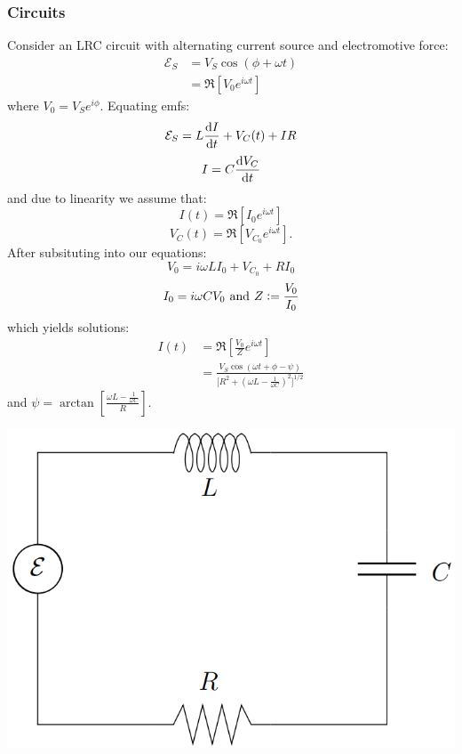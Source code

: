 \documentclass{article}
\newcommand{\deq}{\vcentcolon=}
\begin{document}
\begin{multicols*}{3}
\subsubsection*{Circuits}
Consider an LRC circuit with alternating current source
and electromotive force:
\begin{align*}
    \mathcal{E}_S
    &= V_S\cos(\phi+\omega t) \\
    &= \Re[V_0 e^{i\omega t}]
\end{align*}
where $V_0=V_S e^{i\phi}$. Equating emfs:
$$\mathcal{E}_S=L\dv{I}{t}+V_C(t)+IR$$
$$I=C\dv{V_C}{t}$$
and due to linearity we assume that:
$$I(t)=\Re[I_0 e^{i\omega t}]$$
$$V_C(t)=\Re[V_{C_0} e^{i\omega t}].$$
After subsituting into our equations:
$$V_0=i\omega L I_0+V_{C_0}+RI_0$$
$$I_0=i\omega C V_0
\hspace{0.05in}\text{and}\hspace{0.05in}
Z\deq\frac{V_0}{I_0}$$
which yields solutions:
\begin{align*}
    I(t)
    &=\Re\left[\frac{V_0}{Z}e^{i\omega t}\right] \\
    &=\frac{V_S\cos(\omega t+\phi-\psi)}
    {\bigl[R^2+(\omega L-\frac{1}{\omega C})^2\bigr]^{1/2}}
\end{align*}
and $\displaystyle\psi=\arctan\left[
\frac{\omega L-\frac{1}{\omega C}}{R}\right]$.
\begin{center}
    \includegraphics[scale=0.25]{f11.png}
\end{center}


\end{multicols*}
\end{document}
